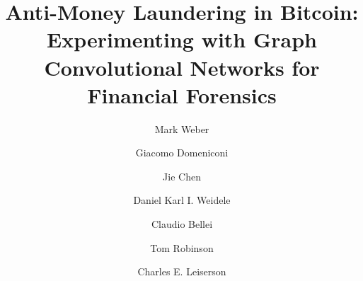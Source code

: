 \documentclass[sigconf,submission]{acmart}
\begin{document}
%

\title{Anti-Money Laundering in Bitcoin: Experimenting with Graph Convolutional Networks for Financial Forensics}
\renewcommand{\shorttitle}{Anti-Money Laundering in Bitcoin}




\author{Mark Weber}

\author{Giacomo Domeniconi}
\authornotemark[1]

\author{Jie Chen}

\author{Daniel Karl I. Weidele}

\author{Claudio Bellei}

\author{Tom Robinson}

\author{Charles E. Leiserson}

\renewcommand{\shortauthors}{Weber and Domeniconi, et al.}
\end{document}
